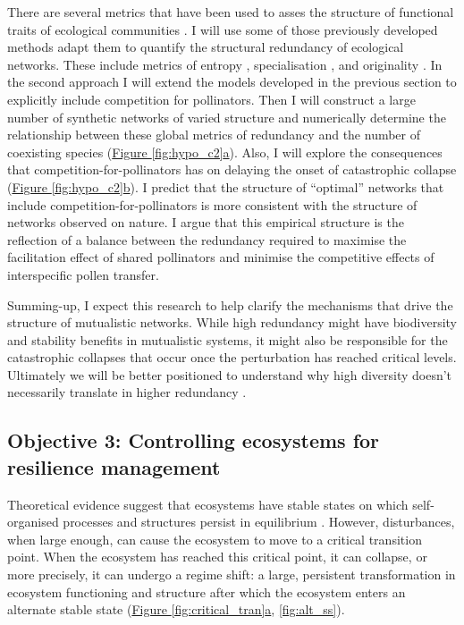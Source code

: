 \documentclass[a4paper]{article}
\begin{document}
There are several metrics that have been used to asses the structure of functional traits of ecological communities \autocite{Mouillot2013}.
I will use some of those previously developed methods adapt them to quantify the structural redundancy of ecological networks.
These include metrics of entropy \autocite{Mokany2008}, specialisation \autocite{Villeger2010}, and originality \autocite{Mouillot2008}.
In the second approach I will extend the models developed in the previous section to explicitly include competition for pollinators.
Then I will construct a large number of synthetic networks of varied structure and numerically determine the relationship between these global metrics of redundancy and the number of coexisting species (\hyperref[fig:hypo_c2]{Figure \ref{fig:hypo_c2}a}).
Also, I will explore the consequences that competition-for-pollinators has on delaying the onset of catastrophic collapse (\hyperref[fig:hypo_c2]{Figure \ref{fig:hypo_c2}b}).
I predict that the structure of ``optimal'' networks that include competition-for-pollinators is more consistent with the structure of networks observed on nature.
I argue that this empirical structure is the reflection of a balance between the redundancy required to maximise the facilitation effect of shared pollinators and minimise the competitive effects of interspecific pollen transfer.

Summing-up, I expect this research to help clarify the mechanisms that drive the structure of mutualistic networks.
While high redundancy might have biodiversity and stability benefits in mutualistic systems, it might also be responsible for the catastrophic collapses that occur once the perturbation has reached critical levels.
Ultimately we will be better positioned to understand why high diversity doesn't necessarily translate in higher redundancy \autocite{Bellwood2003b}.

\subsection*{Objective 3: Controlling ecosystems for resilience management}

Theoretical evidence suggest that ecosystems have stable states on which self-organised processes and structures persist in equilibrium \autocite{Gunderson2000,Ives2007}.
However, disturbances, when large enough, can cause the ecosystem to move to a critical transition point.
When the ecosystem has reached this critical point, it can collapse, or more precisely, it can undergo a regime shift: a large, persistent transformation in ecosystem functioning and structure after which the ecosystem enters an alternate stable state \autocite{Holling1973,May1976, Gunderson2000} (\hyperref[fig:critical_tran]{Figure \ref{fig:critical_tran}a}, \ref{fig:alt_ss}).
\end{document}

